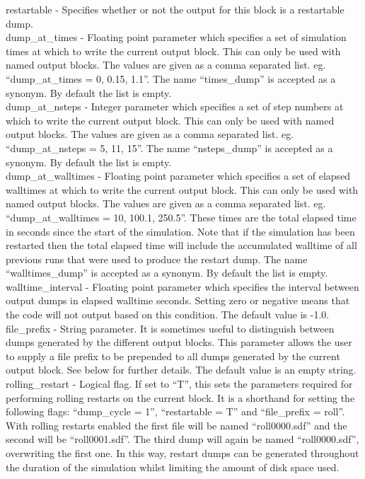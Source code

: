 {\emphtext restartable} - Specifies whether or not the output for this
  block is a restartable dump.\\

{\emphtext dump\_at\_times} - Floating point parameter which specifies a
  set of simulation times at which to write the current output block. This
  can only be used with named output blocks. The values are given as a
  comma separated list. eg. ``dump\_at\_times = 0, 0.15, 1.1''. The name
  ``times\_dump'' is accepted as a synonym. By default
  the list is empty.\\

{\emphtext dump\_at\_nsteps} - Integer parameter which specifies a
  set of step numbers at which to write the current output block. This
  can only be used with named output blocks. The values are given as a
  comma separated list. eg. ``dump\_at\_nsteps = 5, 11, 15''. The name
  ``nsteps\_dump'' is accepted as a synonym. By default
  the list is empty.\\

{\emphtext dump\_at\_walltimes} - Floating point parameter which specifies a
  set of elapsed walltimes at which to write the current output block. This
  can only be used with named output blocks. The values are given as a
  comma separated list. eg. ``dump\_at\_walltimes = 10, 100.1, 250.5''.
  These times are the total elapsed time in seconds since the start of the
  simulation. Note that if the
  simulation has been restarted then the total elapsed time will
  include the accumulated walltime of all previous runs that were
  used to produce the restart dump.
  The name ``walltimes\_dump'' is accepted as a synonym. By default
  the list is empty.\\

{\emphtext walltime\_interval} - Floating point parameter which specifies the
  interval between output dumps in elapsed walltime seconds. Setting zero or
  negative means that the code will not output based on this condition.
  The default value is -1.0.\\

{\emphtext file\_prefix} - String parameter. It is sometimes useful to
  distinguish between dumps generated by the different output blocks. This
  parameter allows the user to supply a file prefix to be prepended to all
  dumps generated by the current output block. See below for further details.
  The default value is an empty string.\\

{\emphtext rolling\_restart} - Logical flag. If set to ``T'', this sets the
  parameters required for performing rolling restarts on the current block.
  It is a shorthand for setting the following flags: ``dump\_cycle = 1'',
  ``restartable = T'' and ``file\_prefix = roll''.
  With rolling restarts enabled the first file will be named ``roll0000.sdf''
  and the second will be ``roll0001.sdf''. The third dump will again be
  named ``roll0000.sdf'', overwriting the first one. In this way, restart
  dumps can be generated throughout the duration of the simulation whilst
  limiting the amount of disk space used.\\

